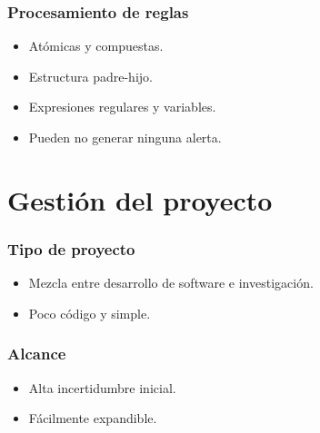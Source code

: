 \documentclass[a4paper,10pt]{beamer}
\begin{document}
\begin{frame}[fragile]
	\frametitle{Procesamiento de reglas}

	\begin{itemize}
		\item Atómicas y compuestas.
		\item Estructura padre-hijo.
		\item Expresiones regulares y variables.
		\item Pueden no generar ninguna alerta.
	\end{itemize}

\end{frame}


\section{Gestión del proyecto}
\begin{frame}[fragile]
	\frametitle{Tipo de proyecto}

	\begin{itemize}
		\item Mezcla entre desarrollo de software e investigación. %
		\item Poco código y simple.
	\end{itemize}
\end{frame}

\begin{frame}[fragile]
	\frametitle{Alcance}

	\begin{itemize}
		\item Alta incertidumbre inicial.
		\item Fácilmente expandible. %
	\end{itemize}
\end{frame}
\end{document}
